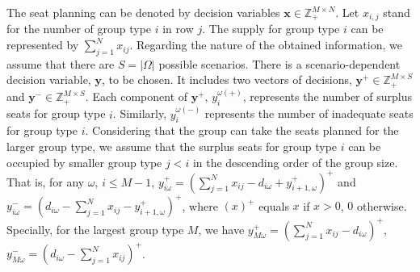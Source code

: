 The seat planning can be denoted by decision variables $\mathbf{x}\in \mathbb{Z}_{+}^{M \times N}$. Let $x_{i,j}$ stand for the number of group type $i$ in row $j$. The supply for group type $i$ can be represented by $\sum_{j=1}^N x_{ij}$.
Regarding the nature of the obtained information, we assume that there are $S = |\Omega|$ possible scenarios. There is a scenario-dependent decision variable, $\mathbf{y}$, to be chosen. It includes two vectors of decisions, $\mathbf{y}^{+} \in \mathbb{Z}_{+}^{M \times S}$ and $\mathbf{y}^{-} \in \mathbb{Z}_{+}^{M \times S}$. Each component of $\mathbf{y}^{+}$, $y_{i}^{\omega(+)}$, represents the number of surplus seats for group type $i$. Similarly, $y_{i}^{\omega(-)}$ represents the number of inadequate seats for group type $i$.
Considering that the group can take the seats planned for the larger group type, we assume that the surplus seats for group type $i$ can be occupied by smaller group type $j<i$ in the descending order of the group size. That is, for any $\omega$, $i \leq M-1$, $y_{i \omega}^{+}=\left(\sum_{j=1}^N x_{ij}- d_{i \omega} + y_{i+1, \omega}^{+}\right)^{+}$ and $y_{i \omega}^{-}=\left(d_{i \omega}- \sum_{j=1}^N x_{ij} - y_{i+1, \omega}^{+} \right)^{+}$, where $(x)^{+}$ equals $x$ if $x>0$, $0$ otherwise. Specially, for the largest group type $M$, we have $y_{M \omega}^{+} = (\sum_{j=1}^N x_{ij} - d_{i \omega})^{+}$, $y_{M \omega}^{-} = (d_{i \omega}- \sum_{j=1}^N x_{ij})^{+}$.








